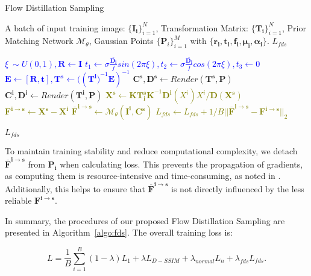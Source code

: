 \begin{algorithm}[h]
  \caption{Flow Distillation Sampling
   \label{algo:fds}} %

  \begin{algorithmic}[1]
\Require
      A batch of input training image: $\{\bm{I_i}\}_{i=1}^{N}$,  
     Transformation Matrix: $\{\bm{T_i}\}_{i=1}^{N}$, 
     Prior Matching Network $\mathcal{M}_{\theta}$, 
     Gaussian Points $\{\bm{P}_{i}\}_{i=1}^M$ with $\{\bm{r_i}, \bm{t_i}, \bm{f_i}, \bm{\mu_i}, \bm{\alpha_i}\}$.
\Ensure
      $L_{fds}$

 \State \textcolor{blue}{$\xi ~\sim  U(0, 1), \bm{R}\leftarrow \bm{I}$}
 \State  \textcolor{blue}{$t_1 \leftarrow  \sigma \frac{\bar{\bm{D_i}}}{f} sin(2 \pi \xi ), 
 t_2 \leftarrow  \sigma  \frac{\bar{\bm{D_i}}}{f} cos(2 \pi \xi ), t_3 \leftarrow 0$}
 \State  \textcolor{blue}{$\bm{E}  \leftarrow [\bm{R}, \bm{t}], \bm{T^s} \leftarrow ((\bm{T^{i})}^{-1} \bm{E})^{-1}$}
 \State $\bm{C^s}, \bm{D^s} \leftarrow Render(\bm{T^s}, \bm{P})$
 \State $\bm{C^i}, \bm{D^i} \leftarrow Render(\bm{T^i}, \bm{P})$
 \State \textcolor{olive}{$\bm{X^s} \leftarrow \bm{KT_{i}^{s}K}^{-1}\bm{D^i}(X^i)X^i/ \bm{D}(\bm{X^s})$}
 \State \textcolor{olive}{$\bm{F^{i\rightarrow s}} \leftarrow  \bm{X^s} - \bm{X^i} $}
 \State  \textcolor{olive}{$\bm{\overline{F}^{i\rightarrow s}} \leftarrow  \mathcal{M}_{\theta}(\bm{I^i}, \bm{C^s})$}
 \State  \textcolor{olive}{$L_{fds} \leftarrow L_{fds} + 1/B || \bm{\overline{F}^{i\rightarrow s}} 
    - \bm{F^{i\rightarrow s}}  ||_2$}
 
 \EndFor
 \State \Return $L_{fds}$
  \end{algorithmic}

\end{algorithm}

To maintain training stability and reduce computational complexity, 
we detach $\bm{\overline{F}^{i\rightarrow s}}$ from $\bm{P_i}$ 
when calculating loss. 
This prevents the propagation of gradients, as computing them is 
resource-intensive and time-consuming, as noted in \citep{poole2022dreamfusion}.
Additionally, this helps to ensure that $\bm{\overline{F}^{i\rightarrow s}}$ is not directly influenced by the less reliable $\bm{F^{i\rightarrow s}}$.

In summary, the procedures of our proposed 
Flow Distillation Sampling are presented 
in Algorithm~\ref{algo:fds}. The overall training loss is:

\begin{equation}
    L = \frac{1}{B}\sum_{i=1}^B(1 - \lambda )L_1 + \lambda L_{D-SSIM} + \lambda_{normal} L_{n} + \lambda_{fds} L_{fds}.
\end{equation}


